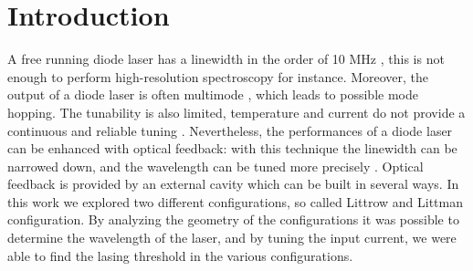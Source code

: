 \documentclass[a4paper,10pt]{article}
\begin{document}
\section{Introduction}
A free running diode laser has a linewidth in the order of 10 MHz \cite{skriptum}, this is not enough to perform high-resolution spectroscopy for instance. Moreover, the output of a diode laser is often multimode \cite{tunablelaser}, which leads to possible mode hopping. The tunability is also limited, temperature and current do not provide a continuous and reliable tuning \cite{lasertunability}. Nevertheless, the performances of a diode laser can be enhanced with optical feedback: with this technique the linewidth can be narrowed down, and the wavelength can be tuned more precisely \cite{lasermodulation}. Optical feedback is provided by an external cavity which can be built in several ways. In this work we explored two different configurations, so called Littrow and Littman configuration. By analyzing the geometry of the configurations it was possible to determine the wavelength of the laser, and by tuning the input current, we were able to find the lasing threshold in the various configurations.
\end{document}
